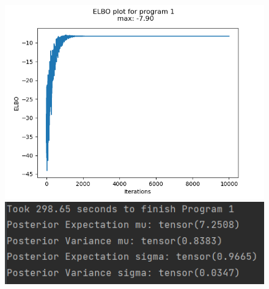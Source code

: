 \documentclass[10pt]{homeworg}
\begin{document}
\begin{figure}[!htbp]
    \centering
    \begin{minipage}{0.45\textwidth}
        \centering
       \includegraphics[scale=0.5]{figures/elbo_program_1.png}
    \end{minipage}\hfill
    \begin{minipage}{0.45\textwidth}
        \centering
        \includegraphics[scale=0.8]{figures/program1_time.png}
    \end{minipage}
\end{figure}

\newpage

\end{document}
